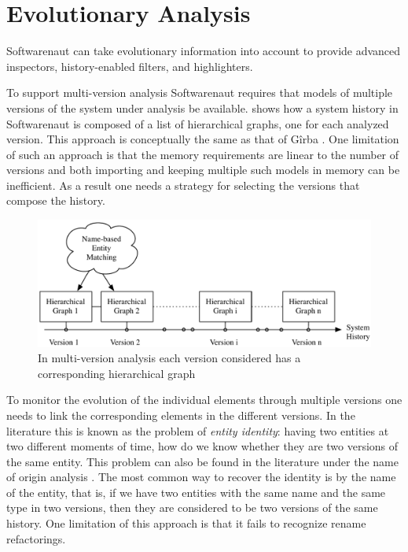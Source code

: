 \documentclass[preprint,12pt]{elsarticle}
\begin{document}
\section {Evolutionary Analysis} 

Softwarenaut can take evolutionary information into account to provide advanced inspectors, history-enabled filters, and highlighters.


To support multi-version analysis Softwarenaut requires that models of multiple versions of the system under analysis be available.  shows how a system history in Softwarenaut is composed of a list of hierarchical graphs, one for each analyzed version. This approach is conceptually the same as that of G{\^i}rba \cite{girba-thesis}. One limitation of such an approach is that the memory requirements are linear to the number of versions and both importing and keeping multiple such models in memory can be inefficient. As a result one needs a strategy for selecting the versions that compose the history.

\begin{figure}[ht]
\begin{center}
\includegraphics[width=0.9\linewidth]{images/MultiVersionAnalysis}
\caption{In multi-version analysis each version considered has a corresponding hierarchical graph}
\end{center}
\end{figure}


To monitor the evolution of the individual elements through multiple versions one needs to link the corresponding elements in the different versions. In the literature this is known as the problem of {\em entity identity}: having two entities at two different moments of time, how do we know whether they are two versions of the same entity. This problem can also be found in the literature under the name of origin analysis \cite{antoniol-discontinuities}. The most common way to recover the identity is by the name of the entity, that is, if we have two entities with the same name and the same type in two versions, then they are considered to be two versions of the same history. One limitation of this approach is that it fails to recognize rename refactorings. 
\end{document}
